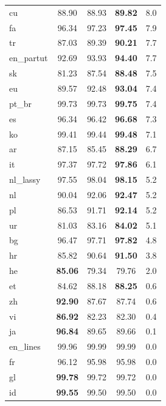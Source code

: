 \documentclass[11pt,a4paper]{article}
\begin{document}
\begin{table}[]
\begin{center}
\begin{tabular}{|l|c||c|c|r|}
cu           &     88.90  &     88.93    & \bf 89.82 &   8.0\\
fa           &     96.34  &     97.23    & \bf 97.45 &   7.9\\
tr           &     87.03  &     89.39    & \bf 90.21 &   7.7\\
en\_partut   &     92.69  &     93.93    & \bf 94.40 &   7.7\\
sk           &     81.23  &     87.54    & \bf 88.48 &   7.5\\  
eu           &     89.57  &     92.48    & \bf 93.04 &   7.4\\
pt\_br       &    99.73  &     99.73    &  \bf 99.75 &   7.4\\
es           &     96.34  &     96.42    & \bf 96.68 &   7.3\\
ko           &     99.41  &   99.44    & \bf     99.48 &   7.1\\
ar           &     87.15  &     85.45    & \bf 88.29 &   6.7\\
it           &     97.37  &  97.72    &  \bf   97.86 &   6.1\\
nl\_lassy    &     97.55  &     98.04    & \bf 98.15 &   5.2\\
nl           &     90.04  &     92.06    & \bf 92.47 &   5.2\\
pl           &     86.53  &     91.71    &\bf  92.14 &   5.2\\
ur           &     81.03  &     83.16    & \bf 84.02 &   5.1\\
bg           &     96.47  &     97.71    & \bf 97.82 &   4.8\\
hr           &     85.82  &     90.64    & \bf 91.50 &   3.8\\
he           & \bf 85.06  &     79.34    &     79.76 &   2.0\\
et           &     84.62  &     88.18    & \bf 88.25 &   0.6\\
zh           & \bf 92.90  &     87.67    &     87.74 &   0.6\\
vi           & \bf 86.92  &     82.23    &     82.30 &   0.4\\
ja           & \bf 96.84  &     89.65    &     89.66 &   0.1\\
en\_lines    &     99.96  &     99.99    &     99.99 &   0.0\\
fr           &     96.12  &     95.98    &     95.98 &   0.0\\
gl           & \bf 99.78  &     99.72    &     99.72 &   0.0\\
id           & \bf 99.55  &     99.50    &     99.50 &   0.0\\

\end{tabular}
\end{center}
\end{table}
\end{document}
